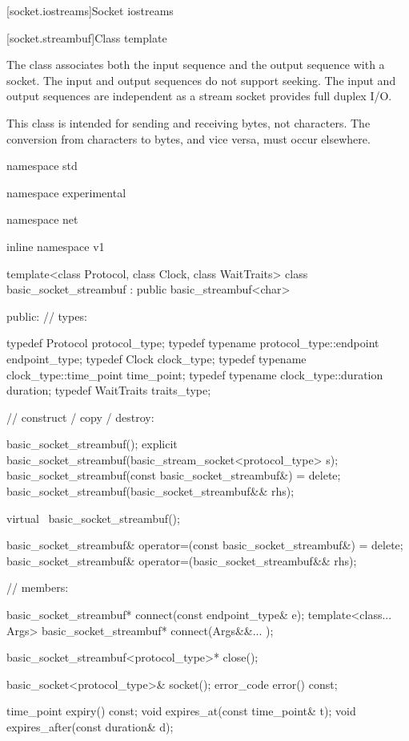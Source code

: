 
[socket.iostreams]{Socket iostreams}


[socket.streambuf]{Class template }

\pnum
The class  associates both the input sequence and the output sequence with a socket. The input and output sequences do not support seeking. \enternote The input and output sequences are independent as a stream socket provides full duplex I/O. \exitnote

\pnum
 \enternote This class is intended for sending and receiving bytes, not characters. The conversion from characters to bytes, and vice versa, must occur elsewhere. \exitnote

\begin{codeblock}
namespace std {
namespace experimental {
namespace net {
inline namespace v1 {

  template<class Protocol, class Clock, class WaitTraits>
  class basic_socket_streambuf : public basic_streambuf<char>
  {
  public:
    // types:

    typedef Protocol protocol_type;
    typedef typename protocol_type::endpoint endpoint_type;
    typedef Clock clock_type;
    typedef typename clock_type::time_point time_point;
    typedef typename clock_type::duration duration;
    typedef WaitTraits traits_type;

    // construct / copy / destroy:

    basic_socket_streambuf();
    explicit basic_socket_streambuf(basic_stream_socket<protocol_type> s);
    basic_socket_streambuf(const basic_socket_streambuf&) = delete;
    basic_socket_streambuf(basic_socket_streambuf&& rhs);

    virtual ~basic_socket_streambuf();

    basic_socket_streambuf& operator=(const basic_socket_streambuf&) = delete;
    basic_socket_streambuf& operator=(basic_socket_streambuf&& rhs);

    // members:

    basic_socket_streambuf* connect(const endpoint_type& e);
    template<class... Args> basic_socket_streambuf* connect(Args&&... );

    basic_socket_streambuf<protocol_type>* close();

    basic_socket<protocol_type>& socket();
    error_code error() const;

    time_point expiry() const;
    void expires_at(const time_point& t);
    void expires_after(const duration& d);

}}}}}
\end{codeblock}
